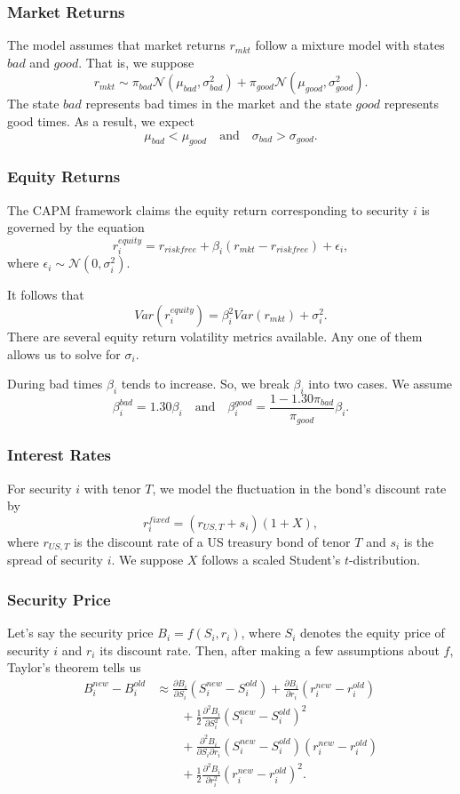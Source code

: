 \documentclass{beamer}
\begin{document}
\begin{frame}
\frametitle{Market Returns}
The model assumes that market returns $r_{mkt}$ follow a mixture model with states $bad$ and $good$. That is, we suppose
$$
r_{mkt}\sim{\pi_{bad}\mathcal{N}(\mu_{bad}, \sigma_{bad}^2) + \pi_{good}\mathcal{N}(\mu_{good}, \sigma_{good}^2)}.
$$
The state $bad$ represents bad times in the market and the state $good$ represents good times. As a result, we expect
$$
\mu_{bad} < \mu_{good}\quad\text{and}\quad \sigma_{bad} > \sigma_{good}.
$$
\end{frame}

\begin{frame}
\frametitle{Equity Returns}
The CAPM framework claims the equity return corresponding to security $i$ is governed by the equation
$$
r_i^{equity} = r_{riskfree} + \beta_i (r_{mkt} - r_{riskfree}) + \epsilon_i,
$$
where $\epsilon_i\sim{\mathcal{N}(0, \sigma_i^2)}$.

It follows that
$$
Var(r_i^{equity}) = \beta_i^2 Var(r_{mkt}) + \sigma_i^2.
$$
There are several equity return volatility metrics available. Any one of them allows us to solve for $\sigma_i$.

During bad times $\beta_i$ tends to increase. So, we break $\beta_i$ into two cases. We assume
$$
\beta_i^{bad} = 1.30\beta_i\quad\text{and}\quad \beta_i^{good} = \frac{1  - 1.30\pi_{bad}}{\pi_{good}}\beta_i.
$$
\end{frame}

\begin{frame}
\frametitle{Interest Rates}
For security $i$ with tenor $T$, we model the fluctuation in the bond's discount rate by
$$
r_i^{fixed} = (r_{US, T} + s_i)(1 + X),
$$
where $r_{US, T}$ is the discount rate of a US treasury bond of tenor $T$ and $s_i$ is the spread of security $i$. We suppose $X$ follows a scaled Student's $t$-distribution.
\end{frame}


\begin{frame}
\frametitle{Security Price}
Let's say the security price $B_i = f(S_i, r_i)$, where $S_i$ denotes the equity price of security $i$ and $r_i$ its discount rate. Then, after making a few assumptions about $f$, Taylor's theorem tells us
\begin{align*}
B_i^{new} - B_i^{old} &\approx \frac{\partial B_i}{\partial S_i} (S_i^{new} - S_i^{old}) + \frac{\partial B_i}{\partial r_i}(r_i^{new} - r_i^{old})\\
				&\qquad + \frac{1}{2}\frac{\partial^2 B_i}{\partial S_i^2} (S_i^{new} - S_i^{old})^2\\ 
				&\qquad + \frac{\partial^2 B_i}{\partial S_i\partial r_i}(S_i^{new} - S_i^{old}) (r_i^{new} - r_i^{old})\\
				&\qquad + \frac{1}{2}\frac{\partial^2 B_i}{\partial r_i^2}(r_i^{new} - r_i^{old})^2.
\end{align*}


\end{frame}
\end{document}
